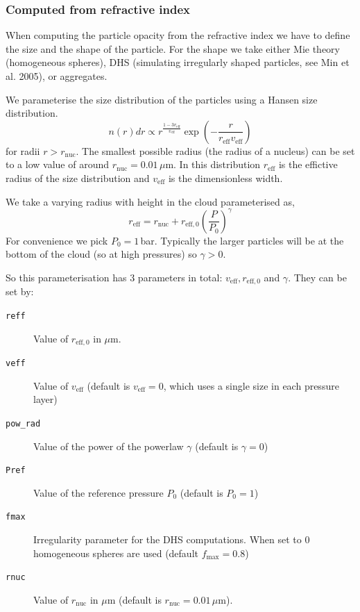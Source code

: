 \documentclass[12pt]{article}
\begin{document}
\subsubsection{Computed from refractive index}

When computing the particle opacity from the refractive index we have to define the size and the shape of the particle. For the shape we take either Mie theory (homogeneous spheres), DHS (simulating irregularly shaped particles, see Min et al. 2005), or aggregates.

We parameterise the size distribution of the particles using a Hansen size distribution.
\begin{equation}
n(r)dr\propto r^\frac{1-3v_\mathrm{eff}}{v_\mathrm{eff}} \exp\left(-\frac{r}{r_\mathrm{eff}v_\mathrm{eff}}\right)
\end{equation}
for radii $r > r_\mathrm{nuc}$. The smallest possible radius (the radius of a nucleus) can be set to a low value of around $r_\mathrm{nuc}=0.01\,\mu$m. In this distribution $r_\mathrm{eff}$ is the effictive radius of the size distribution and $v_\mathrm{eff}$ is the dimensionless width.

We take a varying radius with height in the cloud parameterised as,
\begin{equation}
r_\mathrm{eff}=r_\mathrm{nuc}+r_\mathrm{eff,0}\left(\frac{P}{P_0}\right)^\gamma
\end{equation}
For convenience we pick $P_0=1\,$bar. Typically the larger particles will be at the bottom of the cloud (so at high pressures) so $\gamma>0$.

So this parameterisation has 3 parameters in total: $v_\mathrm{eff}, r_\mathrm{eff,0}$ and $\gamma$. They can be set by:
\begin{description}
\item[\texttt{reff}]
Value of $r_\mathrm{eff,0}$ in $\mu$m.
\item[\texttt{veff}]
Value of $v_\mathrm{eff}$ (default is $v_\mathrm{eff}=0$, which uses a single size in each pressure layer)
\item[\texttt{pow\_rad}]
Value of the power of the powerlaw $\gamma$ (default is $\gamma=0$)
\item[\texttt{Pref}]
Value of the reference pressure $P_0$ (default is $P_0=1$)
\item[\texttt{fmax}]
Irregularity parameter for the DHS computations. When set to 0 homogeneous spheres are used (default $f_\mathrm{max}=0.8$)
\item[\texttt{rnuc}]
Value of $r_\mathrm{nuc}$ in $\mu$m (default is $r_\mathrm{nuc}=0.01\,\mu$m).
\end{description}
\end{document}
